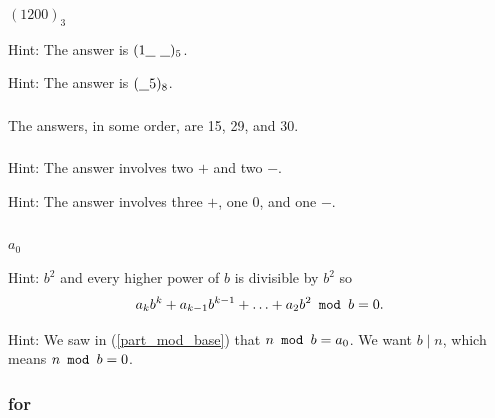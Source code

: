\subsubsection*{ \answers}
\begin{apart}
    \item $(1200)_3$
    \item Hint: The answer is $(1\underline{\hspace{.1in}}~\underline{\hspace{.1in}})_5$.
    \item Hint: The answer is $(\underline{\hspace{.1in}}5)_8$.
\end{apart}

\subsubsection*{ \answers}
The answers, in some order, are 15, 29, and 30.

\subsubsection*{ \answers}
\begin{apart}
    \item Hint: The answer involves two $+$ and two $-$.
    \item Hint: The answer involves three $+$, one 0, and one $-$.
\end{apart}

\subsubsection*{ \answers}
\begin{apart}
    \item \label{part_mod_base} $a_0$
    \item Hint: $b^2$ and every higher power of $b$ is divisible by $b^2$ so $$a_kb^k + a_{k-1}b^{k-1} + \ldots + a_2b^2 \texttt{ mod } b = 0.$$
    \item Hint:  We saw in (\ref{part_mod_base}) that $n \texttt{ mod } b = a_0$.  We want $b \mid n$, which means $n \texttt{ mod } b = 0$.
\end{apart}

\subsubsection{\answers for  \subbinary}

